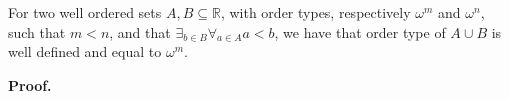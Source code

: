 

\begin{lemma}
For two well ordered sets $A, B \subseteq \mathbb{R}$, with order types, respectively $\omega^m$ 
and $\omega^n$, 
such that $m < n$, and that $\exists_{b\in B}\forall_{a\in A}a<b$, we have that order type of $A \cup B$ is well defined and 
equal to $\omega^m$.
\end{lemma}
\textbf{Proof.} \\

